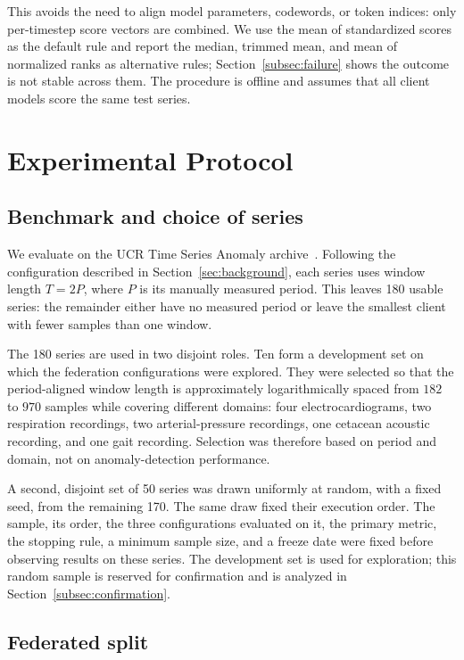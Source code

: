 \documentclass[conference]{IEEEtran}
\begin{document}
This avoids the need to align model parameters, codewords, or token indices: only per-timestep score vectors are combined. We use the mean of standardized scores as the default rule and report the median, trimmed mean, and mean of normalized ranks as alternative rules; Section~\ref{subsec:failure} shows the outcome is not stable across them. The procedure is offline and assumes that all client models score the same test series.

\section{Experimental Protocol}
\label{sec:protocol}

\subsection{Benchmark and choice of series}

We evaluate on the UCR Time Series Anomaly archive~\cite{wu2023ucr}. Following the configuration described in Section~\ref{sec:background}, each series uses window length $T=2P$, where $P$ is its manually measured period. This leaves 180 usable series: the remainder either have no measured period or leave the smallest client with fewer samples than one window.

The 180 series are used in two disjoint roles. Ten form a development set on which the federation configurations were explored. They were selected so that the period-aligned window length is approximately logarithmically spaced from $182$ to $970$ samples while covering different domains: four electrocardiograms, two respiration recordings, two arterial-pressure recordings, one cetacean acoustic recording, and one gait recording. Selection was therefore based on period and domain, not on anomaly-detection performance.

A second, disjoint set of 50 series was drawn uniformly at random, with a fixed seed, from the remaining 170. The same draw fixed their execution order. The sample, its order, the three configurations evaluated on it, the primary metric, the stopping rule, a minimum sample size, and a freeze date were fixed before observing results on these series. The development set is used for exploration; this random sample is reserved for confirmation and is analyzed in Section~\ref{subsec:confirmation}.

\subsection{Federated split}
\label{subsec:split}
\end{document}
